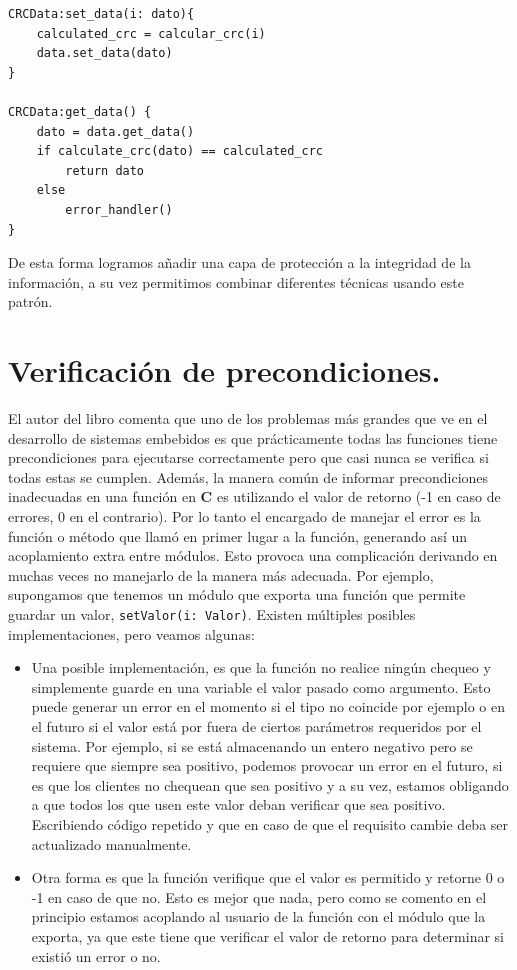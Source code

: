 \begin{lstlisting}
CRCData:set_data(i: dato){
    calculated_crc = calcular_crc(i)
    data.set_data(dato)
}

CRCData:get_data() {
    dato = data.get_data()
    if calculate_crc(dato) == calculated_crc
        return dato
    else
        error_handler()
}
\end{lstlisting}

De esta forma logramos añadir una capa de protección a la integridad de la información, a su vez permitimos combinar diferentes técnicas usando este patrón.

\section{Verificación de precondiciones.}
El autor del libro comenta que uno de los problemas más grandes que ve en el desarrollo de sistemas embebidos es que prácticamente todas las funciones tiene precondiciones para ejecutarse correctamente pero que casi nunca se verifica si todas estas se cumplen. Además, la manera común de informar precondiciones inadecuadas en una función en \textbf{C} es utilizando el valor de retorno (-1 en caso de errores, 0 en el contrario). Por lo tanto el encargado de manejar el error es la función o método que llamó en primer lugar a la función, generando así un acoplamiento extra entre módulos. Esto provoca una complicación derivando en muchas veces no manejarlo de la manera más adecuada. Por ejemplo, supongamos que tenemos un módulo que exporta una función que permite guardar un valor, \verb|setValor(i: Valor)|. Existen múltiples posibles implementaciones, pero veamos algunas:
\begin{itemize}
    \item Una posible implementación, es que la función no realice ningún chequeo y simplemente guarde en una variable el valor pasado como argumento. Esto puede generar un error en el momento si el tipo no coincide por ejemplo o en el futuro si el valor está por fuera de ciertos parámetros requeridos por el sistema. Por ejemplo, si se está almacenando un entero negativo pero se requiere que siempre sea positivo, podemos provocar un error en el futuro, si es que los clientes no chequean que sea positivo y a su vez, estamos obligando a que todos los que usen este valor deban verificar que sea positivo. Escribiendo código repetido y que en caso de que el requisito cambie deba ser actualizado manualmente.
    \item Otra forma es que la función verifique que el valor es permitido y retorne 0 o -1 en caso de que no. Esto es mejor que nada, pero como se comento en el principio estamos acoplando al usuario de la función con el módulo que la exporta, ya que este tiene que verificar el valor de retorno para determinar si existió un error o no.
\end{itemize}

